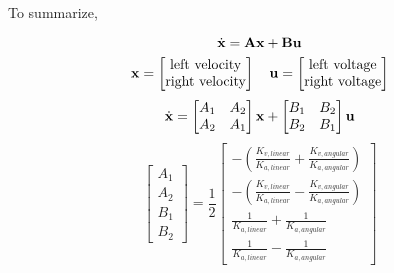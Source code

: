To summarize,
\begin{theorem}
  \begin{equation*}
    \dot{\mathbf{x}} = \mathbf{A}\mathbf{x} + \mathbf{B}\mathbf{u}
  \end{equation*}
  \begin{equation*}
    \mathbf{x} =
    \begin{bmatrix}
      \text{left velocity} \\
      \text{right velocity}
    \end{bmatrix}
    \quad
    \mathbf{u} =
    \begin{bmatrix}
      \text{left voltage} \\
      \text{right voltage}
    \end{bmatrix}
  \end{equation*}
  \begin{equation*}
    \dot{\mathbf{x}} =
    \begin{bmatrix}
      A_1 & A_2 \\
      A_2 & A_1
    \end{bmatrix} \mathbf{x} +
    \begin{bmatrix}
      B_1 & B_2 \\
      B_2 & B_1
    \end{bmatrix} \mathbf{u}
  \end{equation*}
  \begin{equation}
    \begin{bmatrix}
      A_1 \\
      A_2 \\
      B_1 \\
      B_2
    \end{bmatrix} = \frac{1}{2}
    \begin{bmatrix}
      -\left(\frac{K_{v,linear}}{K_{a,linear}} +
        \frac{K_{v,angular}}{K_{a,angular}}\right) \\
      -\left(\frac{K_{v,linear}}{K_{a,linear}} -
        \frac{K_{v,angular}}{K_{a,angular}}\right) \\
      \frac{1}{K_{a,linear}} + \frac{1}{K_{a,angular}} \\
      \frac{1}{K_{a,linear}} - \frac{1}{K_{a,angular}}
    \end{bmatrix}
  \end{equation}
\end{theorem}

